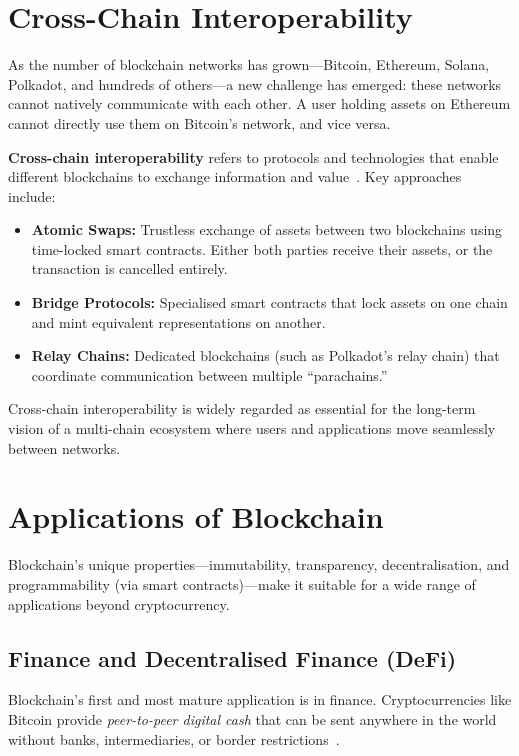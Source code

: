 \section{Cross-Chain Interoperability}
\label{sec:crosschain}

As the number of blockchain networks has grown---Bitcoin, Ethereum, Solana, Polkadot, and hundreds of others---a new challenge has emerged: these networks cannot natively communicate with each other. A user holding assets on Ethereum cannot directly use them on Bitcoin's network, and vice versa.

\textbf{Cross-chain interoperability} refers to protocols and technologies that enable different blockchains to exchange information and value~\cite{zheng2018blockchain}. Key approaches include:

\begin{itemize}
    \item \textbf{Atomic Swaps:} Trustless exchange of assets between two blockchains using time-locked smart contracts. Either both parties receive their assets, or the transaction is cancelled entirely.
    \item \textbf{Bridge Protocols:} Specialised smart contracts that lock assets on one chain and mint equivalent representations on another.
    \item \textbf{Relay Chains:} Dedicated blockchains (such as Polkadot's relay chain) that coordinate communication between multiple ``parachains.''
\end{itemize}

Cross-chain interoperability is widely regarded as essential for the long-term vision of a multi-chain ecosystem where users and applications move seamlessly between networks.

\section{Applications of Blockchain}
\label{sec:applications}

Blockchain's unique properties---immutability, transparency, decentralisation, and programmability (via smart contracts)---make it suitable for a wide range of applications beyond cryptocurrency.

\subsection{Finance and Decentralised Finance (DeFi)}

Blockchain's first and most mature application is in finance. Cryptocurrencies like Bitcoin provide \emph{peer-to-peer digital cash} that can be sent anywhere in the world without banks, intermediaries, or border restrictions~\cite{nakamoto2008bitcoin}.

